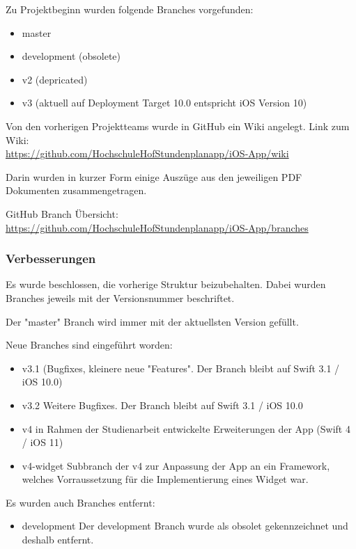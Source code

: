 Zu Projektbeginn wurden folgende Branches vorgefunden:
\begin{itemize}
\item master
\item development (obsolete)
\item v2 (depricated)
\item v3 (aktuell auf Deployment Target 10.0 entspricht iOS Version 10)
\end{itemize}


Von den vorherigen Projektteams wurde in GitHub ein Wiki angelegt.
Link zum Wiki:\\
\url{https://github.com/HochschuleHofStundenplanapp/iOS-App/wiki}

Darin wurden in kurzer Form einige Auszüge aus den jeweiligen PDF Dokumenten zusammengetragen.




GitHub Branch Übersicht:\\
 \url{https://github.com/HochschuleHofStundenplanapp/iOS-App/branches}

\subsubsection{Verbesserungen}
Es wurde beschlossen, die vorherige Struktur beizubehalten. Dabei wurden Branches jeweils mit der Versionsnummer beschriftet.

Der "master" Branch wird immer mit der aktuellsten Version gefüllt.

Neue Branches sind eingeführt worden:
\begin{itemize}
\item v3.1 (Bugfixes, kleinere neue "Features". Der Branch bleibt auf Swift 3.1  / iOS 10.0)
\item v3.2 Weitere Bugfixes. Der Branch bleibt auf Swift 3.1  / iOS 10.0 %
\item v4 in Rahmen der Studienarbeit entwickelte Erweiterungen der App (Swift 4 / iOS 11)
\item v4-widget Subbranch der v4 zur Anpassung der App an ein Framework, welches Vorraussetzung für die Implementierung eines Widget war.
\end{itemize}

Es wurden auch Branches entfernt:
\begin{itemize}
\item development Der development Branch wurde als obsolet gekennzeichnet und deshalb entfernt.
\end{itemize}

